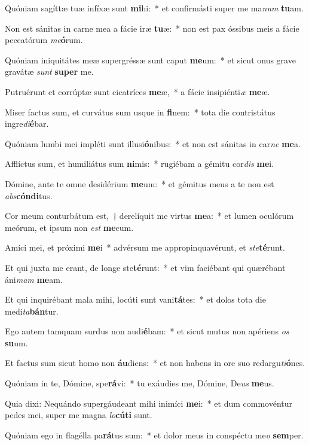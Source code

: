 \item Quóniam sagíttæ tuæ infíxæ sunt \textbf{mi}hi:~* et confirmásti super me ma\textit{num} \textbf{tu}am.
\item Non est sánitas in carne mea a fácie iræ \textbf{tu}æ:~* non est pax óssibus meis a fácie peccatórum \textit{me}\textbf{ó}rum.
\item Quóniam iniquitátes meæ supergréssæ sunt caput \textbf{me}um:~* et sicut onus grave gravátæ \textit{sunt} \textbf{su}\textbf{per} me.
\item Putruérunt et corrúptæ sunt cicatríces \textbf{me}æ,~* a fácie insipiénti\textit{æ} \textbf{me}æ.
\item Miser factus sum, et curvátus sum usque in \textbf{fi}nem:~* tota die contristátus ingre\textit{di}\textbf{é}bar.
\item Quóniam lumbi mei impléti sunt illusi\textbf{ó}nibus:~* et non est sánitas in car\textit{ne} \textbf{me}a.
\item Afflíctus sum, et humiliátus sum \textbf{ni}mis:~* rugiébam a gémitu cor\textit{dis} \textbf{me}i.
\item Dómine, ante te omne desidérium \textbf{me}um:~* et gémitus meus a te non est \textit{abs}\textbf{cón}\textbf{di}tus.
\item Cor meum conturbátum est,~† derelíquit me virtus \textbf{me}a:~* et lumen oculórum meórum, et ipsum non \textit{est} \textbf{me}cum.
\item Amíci mei, et próximi \textbf{me}i~* advérsum me appropinquavérunt, et \textit{ste}\textbf{té}runt.
\item Et qui juxta me erant, de longe ste\textbf{té}runt:~* et vim faciébant qui quærébant áni\textit{mam} \textbf{me}am.
\item Et qui inquirébant mala mihi, locúti sunt vani\textbf{tá}tes:~* et dolos tota die medi\textit{ta}\textbf{bán}tur.
\item Ego autem tamquam surdus non audi\textbf{é}bam:~* et sicut mutus non apériens \textit{os} \textbf{su}um.
\item Et factus sum sicut homo non \textbf{áu}diens:~* et non habens in ore suo redargu\textit{ti}\textbf{ó}nes.
\item Quóniam in te, Dómine, spe\textbf{rá}vi:~* tu exáudies me, Dómine, De\textit{us} \textbf{me}us.
\item Quia dixi: Nequándo supergáudeant mihi inimíci \textbf{me}i:~* et dum commovéntur pedes mei, super me magna \textit{lo}\textbf{cú}\textbf{ti} sunt.
\item Quóniam ego in flagélla pa\textbf{rá}tus sum:~* et dolor meus in conspéctu me\textit{o} \textbf{sem}per.

